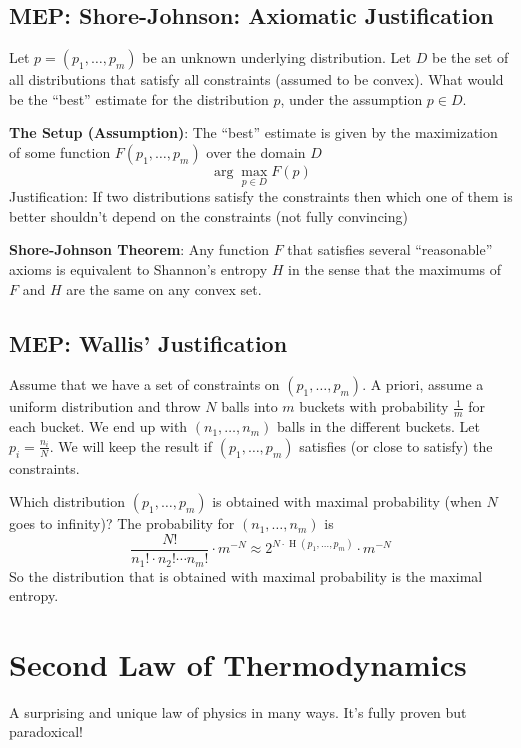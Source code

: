 \documentclass{article}
\begin{document}
\subsection{MEP: Shore-Johnson: Axiomatic Justification}

Let $p=\left(p_1,\ldots,p_m\right)$ be an unknown underlying distribution. Let $D$ be the set of all distributions that satisfy all constraints (assumed to be convex). What would be the ``best'' estimate for the distribution $p$, under the assumption $p\in D$.

\textbf{The Setup (Assumption)}: The ``best'' estimate is given by the maximization of some function $F\left(p_1,\ldots,p_m\right)$ over the domain $D$
\[
\arg\max_{p\in D} F(p)
\]
Justification: If two distributions satisfy the constraints then which one of them is better shouldn't depend on the constraints (not fully convincing)

\textbf{Shore-Johnson Theorem}: Any function $F$ that satisfies several ``reasonable'' axioms is equivalent to Shannon's entropy $H$ in the sense that the maximums of $F$ and $H$ are the same on any convex set.

\subsection{MEP: Wallis' Justification}

Assume that we have a set of constraints on $\left(p_1,\ldots,p_m\right)$. A priori, assume a uniform distribution and throw $N$ balls into $m$ buckets with probability $\frac{1}{m}$ for each bucket. We end up with $\left(n_1,\ldots, n_m\right)$ balls in the different buckets. Let $p_i=\frac{n_i }{N }$. We will keep the result if $\left(p_1,\ldots,p_m\right)$ satisfies (or close to satisfy) the constraints.

Which distribution $\left(p_1,\ldots,p_m\right)$ is obtained with maximal probability (when $N$ goes to infinity)? The probability for $\left(n_1,\ldots, n_m\right)$ is 
\[
\frac{N!}{n_1 ! \cdot n_2 ! \cdots n_m !} \cdot m^{-N}\approx 2^{N\cdot \operatorname{H}\left(p_1,\ldots,p_m\right)}\cdot m^{-N}
\]
So the distribution that is obtained with maximal probability is the maximal entropy.

\section{Second Law of Thermodynamics}

A surprising and unique law of physics in many ways. It's fully proven but paradoxical!
\end{document}
